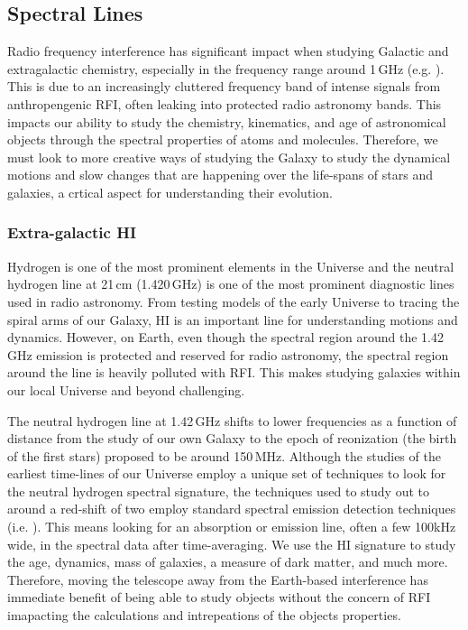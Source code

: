     
    
    

\subsection{Spectral Lines}
Radio frequency interference has significant impact when studying Galactic and extragalactic chemistry, especially in the frequency range around 1\,GHz (e.g. \citealt{Liang_2023}). This is due to an increasingly cluttered frequency band of intense signals from anthropengenic RFI, often leaking into protected radio astronomy bands. This impacts our ability to study the chemistry, kinematics, and age of astronomical objects through the spectral properties of atoms and molecules. Therefore, we must look to more creative ways of studying the Galaxy to study the dynamical motions and slow changes that are happening over the life-spans of stars and galaxies, a crtical aspect for understanding their evolution.

\subsubsection{Extra-galactic HI}
Hydrogen is one of the most prominent elements in the Universe and the neutral hydrogen line at 21\,cm (1.420\,GHz) is one of the most prominent diagnostic lines used in radio astronomy. From testing models of the early Universe to tracing the spiral arms of our Galaxy, H{\sc I} is an important line for understanding motions and dynamics. However, on Earth, even though the spectral region around the 1.42\,GHz emission is protected and reserved for radio astronomy, the spectral region around the line is heavily polluted with RFI. This makes studying galaxies within our local Universe and beyond challenging. 

The neutral hydrogen line at 1.42\,GHz shifts to lower frequencies as a function of distance from the study of our own Galaxy to the epoch of reonization (the birth of the first stars) proposed to be around 150\,MHz. Although the studies of the earliest time-lines of our Universe employ a unique set of techniques to look for the neutral hydrogen spectral signature, the techniques used to study out to around a red-shift of two employ standard spectral emission detection techniques (i.e. \citealt{WALLABY,FLASH}). This means looking for an absorption or emission line, often a few 100kHz wide, in the spectral data after time-averaging. We use the H{\sc I} signature to study the age, dynamics, mass of galaxies, a measure of dark matter, and much more. Therefore, moving the telescope away from the Earth-based interference has immediate benefit of being able to study objects without the concern of RFI imapacting the calculations and intrepeations of the objects properties.

